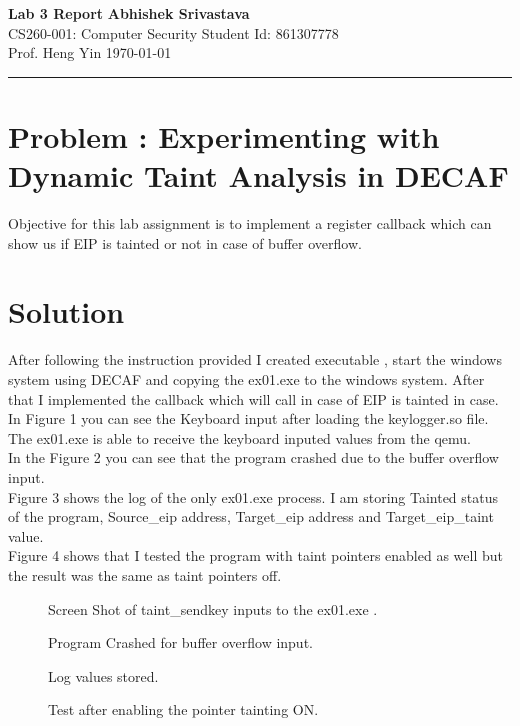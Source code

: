 \documentclass[a4paper, 11pt]{article}
\begin{document}
\noindent
\large\textbf{Lab 3 Report} \hfill \textbf{Abhishek Srivastava} \\
\normalsize CS260-001: Computer Security \hfill Student Id: 861307778 \\
\normalsize Prof. Heng Yin \hfill \today \\
\hrule

\section*{Problem : Experimenting with Dynamic Taint Analysis in DECAF}
Objective for this lab assignment is to implement a register callback which can show us if EIP is tainted or not in case of buffer overflow.

\section*{Solution}
After following the instruction provided I created executable , start the windows system using DECAF and copying the ex01.exe to the windows system. After that I implemented the callback which will call in case of EIP is tainted in case.\\

In Figure 1 you can see the Keyboard input after loading the keylogger.so file. The ex01.exe is able to receive the keyboard inputed values from the qemu.\\

In the Figure 2 you can see that the program crashed due to the buffer overflow input.\\

Figure 3 shows the log of the only ex01.exe process. I am storing Tainted status of the program, Source\_eip address, Target\_eip address and Target\_eip\_taint value.\\

Figure 4 shows that I tested the program with taint pointers enabled as well but the result was the same as taint pointers off.\\
\newpage  
\begin{figure}
	\centering
	\caption{Screen Shot of taint\_sendkey inputs to the ex01.exe .}
\end{figure}
\begin{figure}
	\centering
	\caption{Program Crashed for buffer overflow input.}
\end{figure}
\begin{figure}
	\centering
	\caption{Log values stored.}
\end{figure}
\begin{figure}
	\centering
	\caption{Test after enabling the pointer tainting ON.}
\end{figure}
\end{document}
